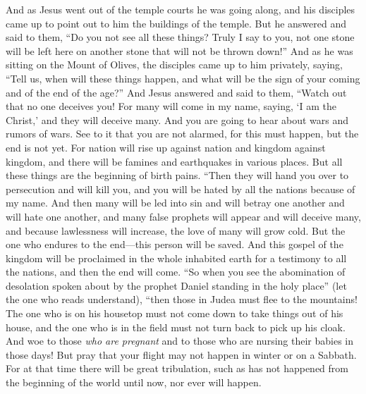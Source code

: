 \begin{biblechapter} %
 And as Jesus went out of the temple courts he was going along, and his disciples came up to point out to him the buildings of the temple.
\verse But he answered and said to them, “Do you not see all these things? Truly I say to you, not one stone will be left here on another stone that will not be thrown down!”
 And as he was sitting on the Mount of Olives, the disciples came up to him privately, saying, “Tell us, when will these things happen, and what will be the sign of your coming and of the end of the age?”
\verse And Jesus answered and said to them, “Watch out that no one deceives you!
\verse For many will come in my name, saying, ‘I am the Christ,’ and they will deceive many.
\verse And you are going to hear about wars and rumors of wars. See to it that you are not alarmed, for this must happen, but the end is not yet.
\verse For nation will rise up against nation and kingdom against kingdom, and there will be famines and earthquakes in various places.
\verse But all these things are the beginning of birth pains.
 “Then they will hand you over to persecution and will kill you, and you will be hated by all the nations because of my name.
\verse And then many will be led into sin and will betray one another and will hate one another,
\verse and many false prophets will appear and will deceive many,
\verse and because lawlessness will increase, the love of many will grow cold.
\verse But the one who endures to the end—this person will be saved.
\verse And this gospel of the kingdom will be proclaimed in the whole inhabited earth for a testimony to all the nations, and then the end will come.
 “So when you see the abomination of desolation spoken about by the prophet Daniel standing in the holy place” (let the one who reads understand),
\verse “then those in Judea must flee to the mountains!
\verse The one who is on his housetop must not come down to take things out of his house,
\verse and the one who is in the field must not turn back to pick up his cloak.
\verse And woe to those \textit{who are pregnant} and to those who are nursing their babies in those days!
\verse But pray that your flight may not happen in winter or on a Sabbath.
\verse For at that time there will be great tribulation, such as has not happened from the beginning of the world until now, nor ever will happen.

\end{biblechapter}
